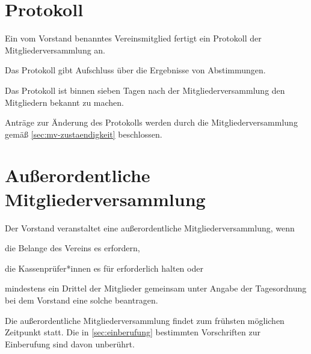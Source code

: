 \section{Protokoll}
\begin{absätze}
    \item Ein vom Vorstand benanntes Vereinsmitglied fertigt ein Protokoll der Mitgliederversammlung an.
    \item Das Protokoll gibt Aufschluss über die Ergebnisse von Abstimmungen.
    \item Das Protokoll ist binnen sieben Tagen nach der Mitgliederversammlung den Mitgliedern bekannt zu machen.
    \item Anträge zur Änderung des Protokolls werden durch die Mitgliederversammlung gemäß \ref{sec:mv-zustaendigkeit} beschlossen.
\end{absätze}

\section{Außerordentliche Mitgliederversammlung}
\begin{absätze}
    \item Der Vorstand veranstaltet eine außerordentliche Mitgliederversammlung, wenn
    \begin{sätze}
        \item die Belange des Vereins es erfordern,
        \item die Kassenprüfer*innen es für erforderlich halten oder
        \item mindestens ein Drittel der Mitglieder gemeinsam unter Angabe der Tagesordnung bei dem Vorstand eine solche beantragen.
	\end{sätze}
\item Die außerordentliche Mitgliederversammlung findet zum frühsten möglichen Zeitpunkt statt. Die in \ref{sec:einberufung} bestimmten Vorschriften zur Einberufung sind davon unberührt.
\end{absätze}
